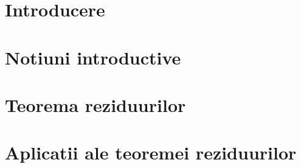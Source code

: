 \documentclass[12pt,a4paper]{article}
\begin{document}


\tableofcontents

\clearpage
\section{Introducere}

\clearpage
\section{Notiuni introductive}


\clearpage
\section{Teorema reziduurilor}


\clearpage
\section{Aplicatii ale teoremei reziduurilor}




\clearpage
\nocite{*}


\end{document}
